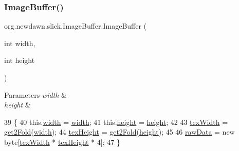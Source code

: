 \subsubsection{\texorpdfstring{Image\+Buffer()}{ImageBuffer()}}
{\footnotesize\ttfamily org.\+newdawn.\+slick.\+Image\+Buffer.\+Image\+Buffer (\begin{DoxyParamCaption}\item[{int}]{width,  }\item[{int}]{height }\end{DoxyParamCaption})\hspace{0.3cm}{\ttfamily [inline]}}


\begin{DoxyParams}{Parameters}
{\em width} & \\
\hline
{\em height} & \\
\hline
\end{DoxyParams}

\begin{DoxyCode}
39                                               \{
40         this.\mbox{\hyperlink{classorg_1_1newdawn_1_1slick_1_1_image_buffer_a3d1afc42dba7eb1ce006daeec78852f3}{width}} = \mbox{\hyperlink{classorg_1_1newdawn_1_1slick_1_1_image_buffer_a3d1afc42dba7eb1ce006daeec78852f3}{width}};
41         this.\mbox{\hyperlink{classorg_1_1newdawn_1_1slick_1_1_image_buffer_a3ddd231a45747a547db36fbd23ad426e}{height}} = \mbox{\hyperlink{classorg_1_1newdawn_1_1slick_1_1_image_buffer_a3ddd231a45747a547db36fbd23ad426e}{height}};
42         
43         \mbox{\hyperlink{classorg_1_1newdawn_1_1slick_1_1_image_buffer_adff2451214c3b558ed4a5a1aa373441c}{texWidth}} = \mbox{\hyperlink{classorg_1_1newdawn_1_1slick_1_1_image_buffer_aeeb1bc84ab69d8175db88425c42f9945}{get2Fold}}(\mbox{\hyperlink{classorg_1_1newdawn_1_1slick_1_1_image_buffer_a3d1afc42dba7eb1ce006daeec78852f3}{width}});
44         \mbox{\hyperlink{classorg_1_1newdawn_1_1slick_1_1_image_buffer_a233e898232a8dcd31df4d8c28c70fb66}{texHeight}} = \mbox{\hyperlink{classorg_1_1newdawn_1_1slick_1_1_image_buffer_aeeb1bc84ab69d8175db88425c42f9945}{get2Fold}}(\mbox{\hyperlink{classorg_1_1newdawn_1_1slick_1_1_image_buffer_a3ddd231a45747a547db36fbd23ad426e}{height}});
45         
46         \mbox{\hyperlink{classorg_1_1newdawn_1_1slick_1_1_image_buffer_a868ea7115032600267528b6894d8c8be}{rawData}} = \textcolor{keyword}{new} byte[\mbox{\hyperlink{classorg_1_1newdawn_1_1slick_1_1_image_buffer_adff2451214c3b558ed4a5a1aa373441c}{texWidth}} * \mbox{\hyperlink{classorg_1_1newdawn_1_1slick_1_1_image_buffer_a233e898232a8dcd31df4d8c28c70fb66}{texHeight}} * 4];
47     \}
\end{DoxyCode}


